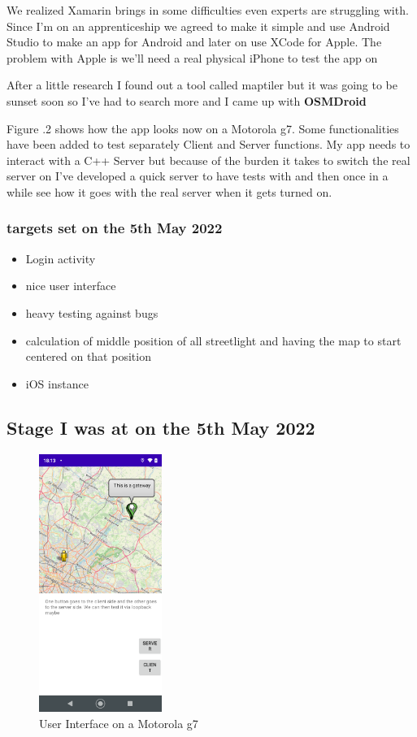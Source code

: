 \documentclass[a4paper,12pt]{article}
\begin{document}
\noindent We realized Xamarin brings in some difficulties even experts are struggling with. Since I'm on an apprenticeship we agreed to make it simple and use Android Studio to make an app for Android and later on use XCode for Apple. The problem with Apple is we'll need a real physical iPhone to test the app on

After a little research I found out a tool called maptiler but it was going to be sunset soon so I've had to search more and I came up with \textbf{OSMDroid}

Figure .2 shows how the app looks now on a Motorola g7. Some functionalities have been added to test separately Client and Server functions. My app needs to interact with a C++ Server but because of the burden it takes to switch the real server on I've developed a quick server to have tests with and then once in a while see how it goes with the real server when it gets turned on.

\subsubsection{targets set on the 5th May 2022}

\begin{itemize}
\item{Login activity}
\item{nice user interface}
\item{heavy testing against bugs}
\item{calculation of middle position of all streetlight and having the map to start centered on that position}
\item{iOS instance}
\end{itemize}

\clearpage

\subsection{Stage I was at on the 5th May 2022}

\begin{figure}
\includegraphics[width=4cm]{./current_status_g7.PNG}
\caption{User Interface on a Motorola g7}\label{wrap-fig:2}
\end{figure}
\end{document}
